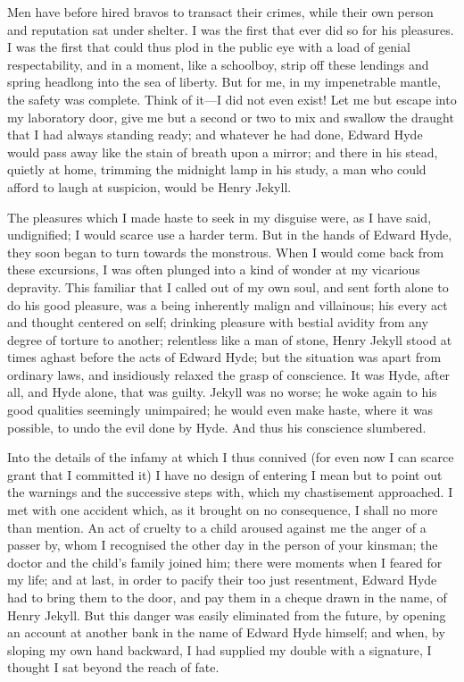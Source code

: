 \documentclass[]{novel}
\begin{document}
Men have before hired bravos to transact their crimes, while their own person and reputation sat under shelter. I was the first that ever did so for his pleasures. I was the first that could thus plod in the public eye with a load of genial respectability, and in a moment, like a schoolboy, strip off these lendings and spring headlong into the sea of liberty. But for me, in my impenetrable mantle, the safety was complete. Think of it—I did not even exist! Let me but escape into my laboratory door, give me but a second or two to mix and swallow the draught that I had always standing ready; and whatever he had done, Edward Hyde would pass away like the stain of breath upon a mirror; and there in his stead, quietly at home, trimming the midnight lamp in his study, a man who could afford to laugh at suspicion, would be Henry Jekyll.

The pleasures which I made haste to seek in my disguise were, as I have said, undignified; I would scarce use a harder term. But in the hands of Edward Hyde, they soon began to turn towards the monstrous. When I would come back from these excursions, I was often plunged into a kind of wonder at my vicarious depravity. This familiar that I called out of my own soul, and sent forth alone to do his good pleasure, was a being inherently malign and villainous; his every act and thought centered on self; drinking pleasure with bestial avidity from any degree of torture to another; relentless like a man of stone, Henry Jekyll stood at times aghast before the acts of Edward Hyde; but the situation was apart from ordinary laws, and insidiously relaxed the grasp of conscience. It was Hyde, after all, and Hyde alone, that was guilty. Jekyll was no worse; he woke again to his good qualities seemingly unimpaired; he would even make haste, where it was possible, to undo the evil done by Hyde. And thus his conscience slumbered.

Into the details of the infamy at which I thus connived (for even now I can scarce grant that I committed it) I have no design of entering I mean but to point out the warnings and the successive steps with, which my chastisement approached. I met with one accident which, as it brought on no consequence, I shall no more than mention. An act of cruelty to a child aroused against me the anger of a passer by, whom I recognised the other day in the person of your kinsman; the doctor and the child's family joined him; there were moments when I feared for my life; and at last, in order to pacify their too just resentment, Edward Hyde had to bring them to the door, and pay them in a cheque drawn in the name, of Henry Jekyll. But this danger was easily eliminated from the future, by opening an account at another bank in the name of Edward Hyde himself; and when, by sloping my own hand backward, I had supplied my double with a signature, I thought I sat beyond the reach of fate.
\end{document}
